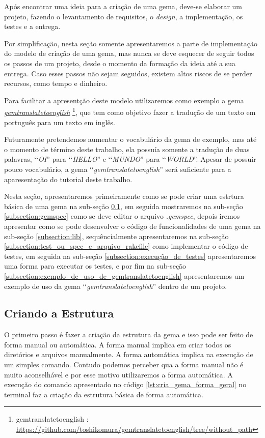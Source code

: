 Após encontrar uma ideia para a criação de uma gema, deve-se elaborar um projeto, fazendo o levantamento 
de requisitos, o \emph{design}, a implementação, os testes e a entrega.

Por simplificação, nesta seção somente apresentaremos a parte de implementação do modelo de criação de uma
gema, mas nunca se deve esquecer de seguir todos os passos de um projeto, desde o momento da formação da 
ideia até a sua entrega. Caso esses passos não sejam seguidos, existem altos riscos de se perder recursos,
como tempo e dinheiro.

Para facilitar a apresentção deste modelo utilizaremos como exemplo a gema 
\emph{\href{https://github.com/toshikomura/gemtranslatetoenglish/tree/without_path}{gemtranslatetoenglish}} 
\footnote{gemtranslatetoenglish : \url{https://github.com/toshikomura/gemtranslatetoenglish/tree/without_path}},
que tem como objetivo fazer a tradução de um texto em português para um texto em inglês. 

Futuramente pretendemos aumentar o vocabulário da gema de exemplo, mas até o momento de término deste 
trabalho, ela possuía somente a tradução de duas palavras, ‘‘\emph{OI}'' para ‘‘\emph{HELLO}'' e 
‘‘\emph{MUNDO}'' para ‘‘\emph{WORLD}''. Apesar de possuir pouco vocabulário, a gema ‘‘\emph{gemtranslatetoenglish}''
será suficiente para a aparesentação do tutorial deste trabalho. 

Nesta seção, apresentaremos primeiramente como se pode criar uma estrtura básica de uma gema na sub-seção 
\ref{subsection:criando_a_estrutura}, em seguida mostraremos na sub-seção \ref{subsection:gemspec} como
se deve editar o arquivo \emph{.gemspec}, depois iremos apresentar como se pode desenvolver o código
de funcionalidades de uma gema na sub-seção \ref{subsection:lib}, sequêncialmente apresentaremos na
sub-seção \ref{subsection:test_ou_spec_e_arquivo_rakefile} como implementar o código de testes, em seguida
na sub-seção \ref{subsection:execução_de_testes} apresentaremos uma forma para executar os testes, 
e por fim na sub-seção \ref{subsection:exemplo_de_uso_de_gemtranslatetoenglish}
apresentaremos um exemplo de uso da gema ‘‘\emph{gemtranslatetoenglish}'' dentro de um projeto.

\subsection{Criando a Estrutura}
\label{subsection:criando_a_estrutura}

O primeiro passo é fazer a criação da estrutura da gema e isso pode ser feito de forma manual ou automática. 
A forma manual implica em criar todos os diretórios e arquivos manualmente. A forma automática implica na
execução de um simples comando. Contudo podemos perceber qua a forma manual não é muito aconselhável e 
por esse motivo utilizaremos a forma automática. A execução do comando apresentado no código
\ref{lst:cria_gema_forma_geral} no terminal faz a criação da estrutura básica de forma automática.

